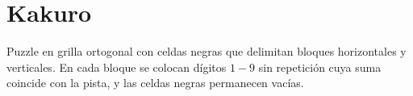 

\section{Kakuro}\label{sec:02-kakuro}
Puzzle en grilla ortogonal con celdas negras que delimitan bloques horizontales y verticales. En cada bloque se colocan dígitos \(1\!-\!9\) sin repetición cuya suma coincide con la pista, y las celdas negras permanecen vacías.
